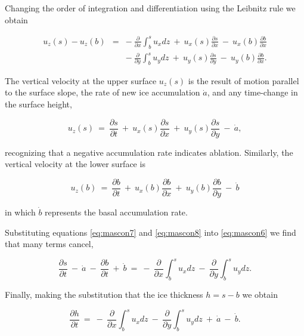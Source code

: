 Changing the order of integration and differentiation using the Leibnitz rule we obtain

\begin{equation}
\begin{matrix}
u_{z} \left(s\right)-u_{z} \left(b\right) & = & -~\frac{\partial}{\partial x} \int_{b}^{s} u_{x} dz ~ +~u_{x}(s)\frac{\partial s}{\partial x} ~-~ u_{x}(b)\frac{\partial b}{\partial x}  \\ 
& & -~\frac{\partial}{\partial y}\int_{b}^{s} u_{y} dz   ~ +~u_{y}(s)\frac{\partial s}{\partial y} ~-~ u_{y}(b)\frac{\partial b}{\partial x}.
\end{matrix}
\label{eq:mascon6}
\end{equation}

The vertical velocity at the upper surface $u_{z}(s)$ is the result of motion parallel to the surface slope, 
the rate of new ice accumulation $\dot{a}$, and any time-change in the surface height,

\begin{equation}
u_{z} \left(s\right)~=~\frac{\partial s}{\partial t}~+~u_{x}(s)\frac{\partial s}{\partial x}~+~u_{y}(s)\frac{\partial s}{\partial y}~-~\dot{a}, 
\label{eq:mascon7}
\end{equation}

recognizing that a negative accumulation rate indicates ablation. Similarly, the vertical velocity at the lower surface is

\begin{equation}
u_{z} \left(b\right)~=~\frac{\partial b}{\partial t}~+~u_{x}(b)\frac{\partial b}{\partial x}~+~u_{y}(b)\frac{\partial b}{\partial y}~-~\dot{b} 
\label{eq:mascon8}
\end{equation}

in which $\dot{b}$ represents the basal accumulation rate.

Substituting equations \eqref{eq:mascon7} and \eqref{eq:mascon8} into \eqref{eq:mascon6} we find that many terms cancel,

\begin{equation}
\frac{\partial s}{\partial t}~-~\dot{a}~-~\frac{\partial b}{\partial t}~+~\dot{b}~=~-~\frac{\partial}{\partial x} \int_{b}^{s} u_{x} dz~-~\frac{\partial}{\partial y} \int_{b}^{s} u_{y} dz.
\label{eq:mascon9}
\end{equation}

Finally, making the substitution that the ice thickness $h=s-b$ we obtain

\begin{equation}
\frac{\partial h}{\partial t}~=~-~\frac{\partial}{\partial x} \int_{b}^{s} u_{x} dz~-~\frac{\partial}{\partial y} \int_{b}^{s} u_{y} dz ~+~\dot{a}~-~\dot{b}.
\label{eq:mascon10}
\end{equation}

